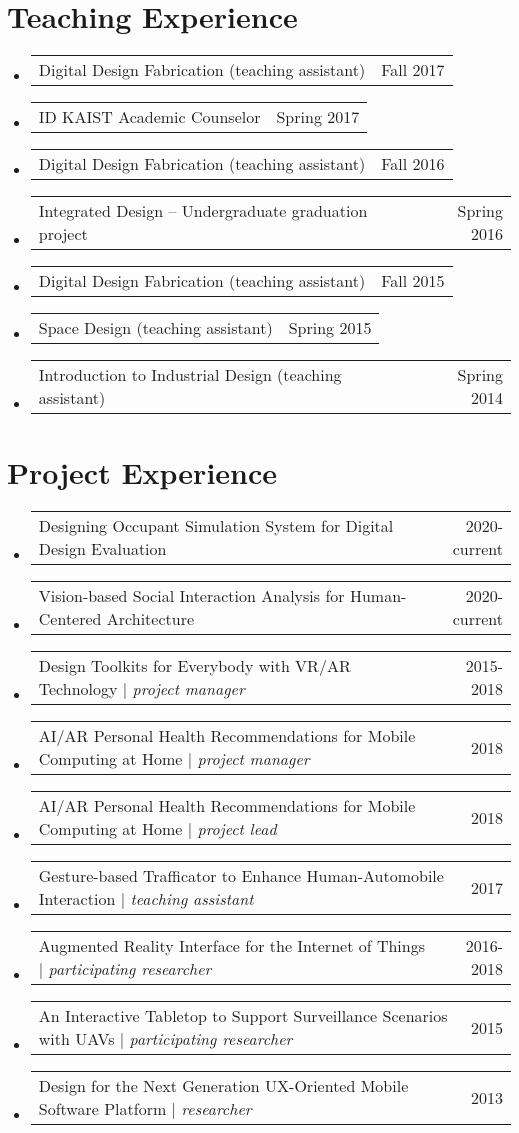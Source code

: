 \documentclass[letterpaper,11pt]{article} %
\makeatletter
\newcommand{\CVSubheading}[4]{
  \vspace{-2pt}\item
    \begin{tabular*}{0.97\textwidth}[t]{l@{\extracolsep{\fill}}r}
      \textbf{#1} & #2 \\
      \small#3 & \small #4 \\
    \end{tabular*}\vspace{-7pt}
}
\newcommand{\CVSubSubheading}[2]{
    \item
    \begin{tabular*}{0.97\textwidth}{l@{\extracolsep{\fill}}r}
      \small{#1} & #2 \\
    \end{tabular*}\vspace{-7pt}
}
\newcommand{\CVSubHeadingListStart}{\begin{itemize}[leftmargin=0.5cm, label={}]}
\newcommand{\CVSubHeadingListEnd}{\end{itemize}}
\makeatother
\begin{document}
\begin{comment}
Section is here as it applied to my application for positions in academia. 
Remember to tailor the resume for to the position.
\end{comment}

\section{Teaching Experience}
  \CVSubHeadingListStart
    \CVSubSubheading
      {Digital Design Fabrication (teaching assistant)}{Fall 2017}
    \CVSubSubheading
      {ID KAIST Academic Counselor}{Spring 2017}
    \CVSubSubheading
      {Digital Design Fabrication (teaching assistant)}{Fall 2016}
    \CVSubSubheading
      {Integrated Design – Undergraduate graduation project}{Spring 2016}
    \CVSubSubheading
      {Digital Design Fabrication (teaching assistant)}{Fall 2015}
    \CVSubSubheading
      {Space Design (teaching assistant)}{Spring 2015}
    \CVSubSubheading
      {Introduction to Industrial Design (teaching assistant)}{Spring 2014}
  \CVSubHeadingListEnd

\section{Project Experience}
  \CVSubHeadingListStart
    \CVSubSubheading
      {Designing Occupant Simulation System for Digital Design Evaluation}{2020-current}
    \CVSubSubheading
      {Vision-based Social Interaction Analysis for Human-Centered Architecture}{2020-current}
    \CVSubSubheading
      {Design Toolkits for Everybody with VR/AR Technology $|$ \textit{project manager}}{2015-2018}
    \CVSubSubheading
      {AI/AR Personal Health Recommendations for Mobile Computing at Home $|$ \textit{project manager}}{2018}
    \CVSubSubheading
      {AI/AR Personal Health Recommendations for Mobile Computing at Home $|$ \textit{project lead}}{2018}
    \CVSubSubheading
      {Gesture-based Trafficator to Enhance Human-Automobile Interaction $|$ \textit{teaching assistant}}{2017}
    \CVSubSubheading
      {Augmented Reality Interface for the Internet of Things $|$ \textit{participating researcher}}{2016-2018}
    \CVSubSubheading
      {An Interactive Tabletop to Support Surveillance Scenarios with UAVs $|$ \textit{participating researcher}}{2015}
    \CVSubSubheading
      {Design for the Next Generation UX-Oriented Mobile Software Platform $|$ \textit{researcher}}{2013}
  \CVSubHeadingListEnd
\end{document}
